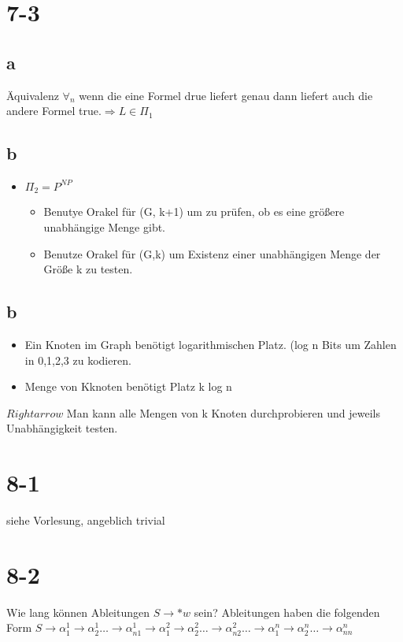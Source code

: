 \documentclass[12pt, oneside, a4paper, numbers=enddot, abstracton, parskip=full]{scrreprt}
\begin{document}
\section{7-3}
\subsection{a}
Äquivalenz $\forall_n$ wenn die eine Formel drue liefert genau dann liefert auch die andere Formel true.$\Rightarrow L\in \Pi_1$
\subsection{b}
\begin{itemize}
\item $\Pi_2 = P^{NP}$
  \begin{itemize}
  \item Benutye Orakel für (G, k+1) um zu prüfen, ob es eine größere unabhängige Menge gibt.
  \item Benutze Orakel für (G,k) um Existenz einer unabhängigen Menge der Größe k zu testen.
  \end{itemize}
\end{itemize}

\subsection{b}
\begin{itemize}
\item Ein Knoten im Graph benötigt logarithmischen Platz. (log n Bits um Zahlen in {0,1,2,3} zu kodieren.
\item Menge von Kknoten benötigt Platz k log n
\end{itemize}

$Rightarrow$ Man kann alle Mengen von k Knoten durchprobieren und jeweils Unabhängigkeit testen.

\section{8-1}
siehe Vorlesung, angeblich trivial

\section{8-2}
Wie lang können Ableitungen $ S\rightarrow *w$ sein?
Ableitungen haben die folgenden Form $S \rightarrow \alpha^1_1 \rightarrow \alpha^1_2 \dots \rightarrow \alpha^1_{n1}  \rightarrow \alpha^2_1 \rightarrow \alpha^2_2 \dots \rightarrow \alpha^2_{n2} \dots \rightarrow \alpha^n_1 \rightarrow \alpha^n_2 \dots \rightarrow \alpha^n_{nn}$
\end{document}
